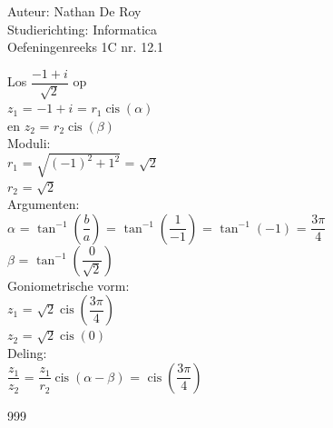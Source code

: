 \documentclass[a4paper]{article}
\begin{document}
  
\noindent \large Auteur: Nathan De Roy \\
\noindent \large Studierichting: Informatica\\
\noindent \large Oefeningenreeks 1C nr. 12.1\\

\medskip

\normalsize

Los $\dfrac{-1 + i}{\sqrt{2}}$ op\\

$z_1$ = $-1 + i$ = $r_1 \operatorname{cis}(\alpha)$\\

en $z_2$ = $r_2 \operatorname{cis}(\beta)$\\

Moduli:\\

$r_1$ = $\sqrt{(-1)^2 + 1^2}$ = $\sqrt{2}$\\

$r_2$ = $\sqrt{2}$\\

Argumenten:\\

$\alpha$ = $\tan^{-1}\left(\dfrac{b}{a}\right)$ = $\tan^{-1}\left(\dfrac{1}{-1}\right)$ = $\tan^{-1}(-1)$ = $\dfrac{3 \pi}{4}$\\

$\beta$ = $\tan^{-1}\left(\dfrac{0}{\sqrt{2}}\right)$\\

Goniometrische vorm:\\

$z_1$ = $\sqrt{2} \operatorname{cis}(\dfrac{3 \pi}{4})$\\

$z_2$ = $\sqrt{2} \operatorname{cis}(0)$\\

Deling:\\

$\dfrac{z_1}{z_2}$ = $\dfrac{z_1}{r_2}\operatorname{cis}(\alpha-\beta)$ = $\operatorname{cis}\left(\dfrac{3\pi}{4}\right)$\\

\begin{thebibliography}{999}
\end{thebibliography}
\end{document}
